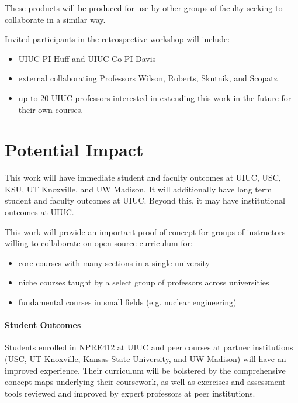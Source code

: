 \documentclass[11pt]{article}
\begin{document}
          These products will be produced for use by other groups of faculty 
          seeking to collaborate in a similar way.

          Invited participants in the retrospective workshop will include:

          \begin{itemize}
                  \item UIUC PI Huff and UIUC Co-PI Davis
                  \item external collaborating Professors Wilson, Roberts, 
                          Skutnik, and Scopatz
                  \item up to 20 UIUC professors interested in extending this 
                          work in the future for their own courses.
          \end{itemize}


          \section*{Potential Impact}
          This work will have immediate student and faculty outcomes at UIUC, 
          USC, KSU, UT Knoxville, and UW Madison. It will additionally have long term 
          student and faculty outcomes at UIUC. Beyond this, it may have 
          institutional outcomes at UIUC. 
          
          This work will provide an important proof of concept for groups of 
          instructors willing to collaborate on open source curriculum for:
          \begin{itemize}
                  \item core courses with many sections in a single university
                  \item niche courses taught by a select group of professors across 
          universities
                  \item fundamental courses in small fields (e.g. nuclear engineering)
          \end{itemize}

          \paragraph{Student Outcomes}
          Students enrolled in NPRE412 at UIUC and peer courses at partner 
          institutions (USC, UT-Knoxville, Kansas State University, and 
          UW-Madison) will have an improved experience. Their 
          curriculum will be bolstered by the comprehensive concept maps 
          underlying their coursework\cite{concept_maps}, as well as exercises 
          and assessment tools reviewed and improved by expert professors at 
          peer institutions. 
\end{document}
